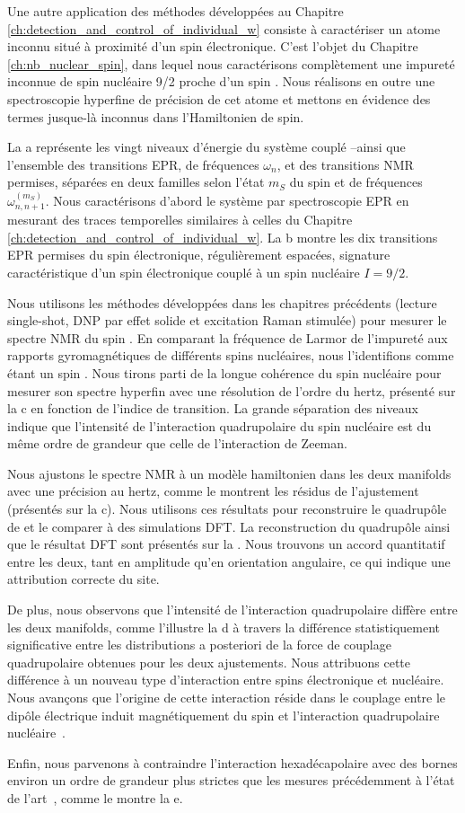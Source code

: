 Une autre application des méthodes développées au Chapitre \ref{ch:detection_and_control_of_individual_w} consiste à caractériser un atome inconnu situé à proximité d'un spin électronique. C'est l'objet du Chapitre \ref{ch:nb_nuclear_spin}, dans lequel nous caractérisons complètement une impureté inconnue de spin nucléaire 9/2 proche d'un spin \Er. Nous réalisons en outre une spectroscopie hyperfine de précision de cet atome \Nb et mettons en évidence des termes jusque-là inconnus dans l'Hamiltonien de spin.

La a représente les vingt niveaux d'énergie du système couplé \Nb--\Er ainsi que l'ensemble des transitions EPR, de fréquences $\omega_n$, et des transitions NMR permises, séparées en deux familles selon l'état $m_S$ du spin \Er et de fréquences $\omega_{n,n+1}^{(m_S)}$. Nous caractérisons d'abord le système par spectroscopie EPR en mesurant des traces temporelles similaires à celles du Chapitre \ref{ch:detection_and_control_of_individual_w}. La b montre les dix transitions EPR permises du spin électronique, régulièrement espacées, signature caractéristique d'un spin électronique couplé à un spin nucléaire $I=9/2$.

Nous utilisons les méthodes développées dans les chapitres précédents (lecture single-shot, DNP par effet solide et excitation Raman stimulée) pour mesurer le spectre NMR du spin \Nb. En comparant la fréquence de Larmor de l'impureté aux rapports gyromagnétiques de différents spins nucléaires, nous l'identifions comme étant un spin \Nb. Nous tirons parti de la longue cohérence du spin nucléaire pour mesurer son spectre hyperfin avec une résolution de l'ordre du hertz, présenté sur la c en fonction de l'indice de transition. La grande séparation des niveaux indique que l'intensité de l'interaction quadrupolaire du spin nucléaire est du même ordre de grandeur que celle de l'interaction de Zeeman.

Nous ajustons le spectre NMR à un modèle hamiltonien dans les deux manifolds \Er avec une précision au hertz, comme le montrent les résidus de l'ajustement (présentés sur la c). Nous utilisons ces résultats pour reconstruire le quadrupôle de \Nb et le comparer à des simulations DFT. La reconstruction du quadrupôle ainsi que le résultat DFT sont présentés sur la . Nous trouvons un accord quantitatif entre les deux, tant en amplitude qu'en orientation angulaire, ce qui indique une attribution correcte du site.

De plus, nous observons que l'intensité de l'interaction quadrupolaire diffère entre les deux manifolds, comme l'illustre la d à travers la différence statistiquement significative entre les distributions a posteriori de la force de couplage quadrupolaire obtenues pour les deux ajustements. Nous attribuons cette différence à un nouveau type d'interaction entre spins électronique et nucléaire. Nous avançons que l'origine de cette interaction réside dans le couplage entre le dipôle électrique induit magnétiquement du spin \Er et l'interaction quadrupolaire nucléaire~.

Enfin, nous parvenons à contraindre l'interaction hexadécapolaire avec des bornes environ un ordre de grandeur plus strictes que les mesures précédemment à l'état de l'art~, comme le montre la e.